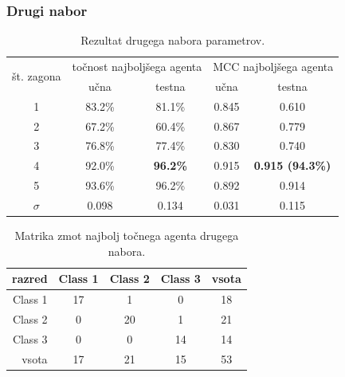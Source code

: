 \subsubsection{Drugi nabor}
\begin{table}[H]
    \begin{center}
        \begin{tabular}{|| c | c c || c c ||}
            \hline
            \multirow{2}{*}{št. zagona} & \multicolumn{2}{c||}{točnost najboljšega agenta} & \multicolumn{2}{c||}{MCC najboljšega agenta} \\ \cline{2-5}
            & učna   & testna          & učna  & testna                  \\
            \hline
            1        & 83.2\% & 81.1\%          & 0.845 & 0.610                   \\
            \hline
            2        & 67.2\% & 60.4\%          & 0.867 & 0.779                   \\
            \hline
            3        & 76.8\% & 77.4\%          & 0.830 & 0.740                   \\
            \hline
            4        & 92.0\% & \textbf{96.2\%} & 0.915 & \textbf{0.915 (94.3\%)} \\
            \hline
            5        & 93.6\% & 96.2\%          & 0.892 & 0.914                   \\
            \hline
            $\sigma$ & 0.098  & 0.134           & 0.031 & 0.115                   \\
            \hline
        \end{tabular}
    \end{center}
    \caption{Rezultat drugega nabora parametrov.}
    \label{tab:wine_result_2}
\end{table}

\begin{table}[H]
    \centering
    \begin{tabular}{||rcccc||}
        \hline
        razred  & Class 1 & Class 2 & Class 3 & vsota \\ \hline
        Class 1 & 17      & 1       & 0       & 18    \\ \hline
        Class 2 & 0       & 20      & 1       & 21    \\ \hline
        Class 3 & 0       & 0       & 14      & 14    \\ \hline
        vsota   & 17      & 21      & 15      & 53    \\ \hline
    \end{tabular}
    \caption{Matrika zmot najbolj točnega agenta drugega nabora.}
    \label{tab:wine_acc_2}
\end{table}

